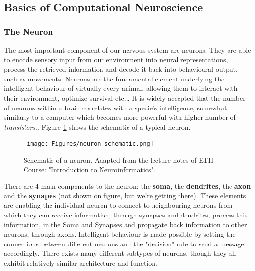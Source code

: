 \subsection{Basics of Computational Neuroscience}

\label{sec:neurons_synapses}

\subsubsection{The Neuron}

The most important component of our nervous system are neurons. They are able to encode sensory input from our environment into neural representations, process the retrieved information and decode it back into behavioural output, such as movements. Neurons are the fundamental element underlying the intelligent behaviour of virtually every animal, allowing them to interact with their environment, optimize survival etc... It is widely accepted that the number of neurons within a brain correlates with a specie's intelligence, somewhat similarly to a computer which becomes more powerful with higher number of \textit{transistors}.. Figure \ref{fig:schematic_neuron} shows the schematic of a typical neuron.\\

\begin{figure}
    \centering
    \texttt{[image: Figures/neuron\_schematic.png]}
    \caption{Schematic of a neuron. Adapted from the lecture notes of ETH Course: "Introduction to Neuroinformatics".}
    \label{fig:schematic_neuron}
\end{figure}

There are 4 main components to the neuron: the \textbf{soma}, the \textbf{dendrites}, the \textbf{axon} and the \textbf{synapes} (not shown on figure, but we're getting there). These elements are enabling the individual neuron to connect to neighbouring neurons from which they can receive information, through synapses and dendrites, process this information, in the Soma and Synapses and propagate back information to other neurons, through axons. Intelligent behaviour is made possible by setting the connections between different neurons and the "decision" rule to send a message accordingly. There exists many different subtypes of neurons, though they all exhibit relatively similar architecture and function. 

